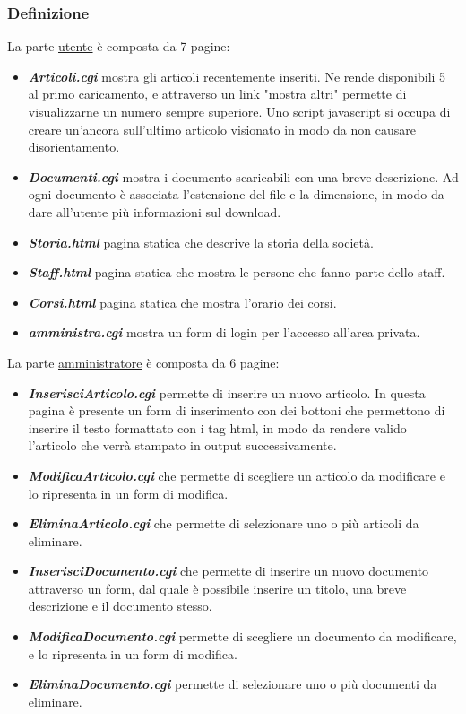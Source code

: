 \subsubsection{Definizione}
	\noindent La parte \underline{utente} \`e composta da 7 pagine:
\begin{itemize}
	\item {\bfseries\textit{Articoli.cgi}} mostra gli articoli recentemente inseriti. Ne rende disponibili 5 al primo caricamento, e attraverso un link "mostra altri" permette di visualizzarne un numero sempre superiore. Uno script javascript si occupa di creare un'ancora sull'ultimo articolo visionato in modo da non causare disorientamento.
	\item {\bfseries\textit{Documenti.cgi}} mostra i documento scaricabili con una breve descrizione. Ad ogni documento \`e associata l'estensione del file e la dimensione, in modo da dare all'utente pi\`u informazioni sul download.
	\item {\bfseries\textit{Storia.html}} pagina statica che descrive la storia della societ\`a.
	\item {\bfseries\textit{Staff.html}} pagina statica che mostra le persone che fanno parte dello staff.
	\item {\bfseries\textit{Corsi.html}} pagina statica che mostra l'orario dei corsi.
	\item {\bfseries\textit{amministra.cgi}} mostra un form di login per l'accesso all'area privata.
\end{itemize}

La parte \underline{amministratore} \`e composta da 6 pagine:
\begin{itemize}
	\item {\bfseries\textit{InserisciArticolo.cgi}} permette di inserire un nuovo articolo. In questa pagina \`e presente un form di inserimento con dei bottoni che permettono di inserire il testo formattato con i tag html, in modo da rendere valido l'articolo che verr\`a stampato in output successivamente.
	\item {\bfseries\textit{ModificaArticolo.cgi}} che permette di scegliere un articolo da modificare e lo ripresenta in un form di modifica.
	\item {\bfseries\textit{EliminaArticolo.cgi}} che permette di selezionare uno o pi\`u articoli da eliminare.
	\item {\bfseries\textit{InserisciDocumento.cgi}} che permette di inserire un nuovo documento attraverso un form, dal quale \`e possibile inserire un titolo, una breve descrizione e il documento stesso.
	\item {\bfseries\textit{ModificaDocumento.cgi}} permette di scegliere un documento da modificare, e lo ripresenta in un form di modifica.
	\item {\bfseries\textit{EliminaDocumento.cgi}}  permette di selezionare uno o pi\`u documenti da eliminare.
\end{itemize}

